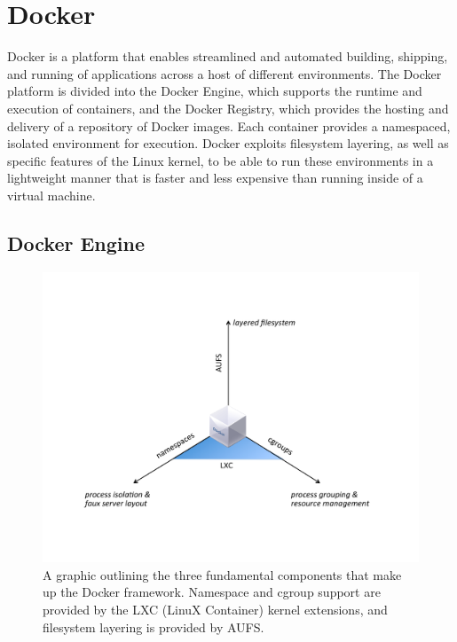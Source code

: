 \documentclass[\myfontsize, letterpaper]{article}
\begin{document}
\section{Docker}
\label{sec:docker}
Docker is a platform that enables streamlined and automated building, shipping, and running of applications across a host of different environments. The Docker platform is divided into the Docker Engine, which supports the runtime and execution of containers, and the Docker Registry, which provides the hosting and delivery of a repository of Docker images. Each container provides a namespaced, isolated environment for execution. Docker exploits filesystem layering, as well as specific features of the Linux kernel, to be able to run these environments in a lightweight manner that is faster and less expensive than running inside of a virtual machine.

\subsection{Docker Engine}

\begin{figure}[h]
\centering
    \includegraphics[width=1.0\textwidth]{docker.pdf}
    \caption{A graphic outlining the three fundamental components that make up the Docker framework. Namespace and cgroup support are provided by the LXC (LinuX Container) kernel extensions, and filesystem layering is provided by AUFS.}
\end{figure}
\end{document}
